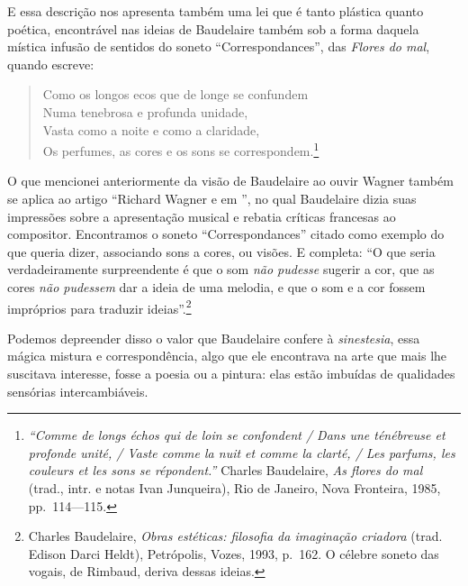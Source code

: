 E essa descrição nos apresenta também uma lei que é tanto plástica
quanto poética, encontrável nas ideias de Baudelaire também sob a forma
daquela mística infusão de sentidos do soneto “Correspondances”, das
\textit{Flores do mal}, quando escreve: 

\begin{hedraquote}
\begin{verse}
Como os longos ecos que de longe se confundem \\ 
Numa tenebrosa e profunda unidade, \\ 
Vasta como a noite e como a claridade, \\ 
Os perfumes, as cores e os sons se correspondem.\footnote{ \textit{``Comme de longs échos qui de loin se confondent /
Dans une ténébreuse et profonde unité, /
Vaste comme la nuit et comme la clarté, / 
Les parfums, les couleurs et les sons se répondent.''} 
Charles Baudelaire, \textit{As flores do mal}
(trad., intr. e notas Ivan Junqueira), Rio de Janeiro, Nova
Fronteira, 1985, pp.~114---115.}
\end{verse}
\end{hedraquote}

O que mencionei anteriormente da visão de Baudelaire ao ouvir Wagner também se
aplica ao artigo “Richard Wagner e  em ”, no qual
Baudelaire dizia suas impressões sobre a apresentação musical e rebatia
críticas francesas ao compositor. Encontramos o soneto
“Correspondances” citado como exemplo do que queria dizer, associando
sons a cores, ou visões. E completa: “O que seria verdadeiramente
surpreendente é que o som \textit{não pudesse} sugerir a cor, que as
cores \textit{não pudessem} dar a ideia de uma melodia, e que o som e a
cor fossem impróprios para traduzir ideias”.\footnote{ Charles Baudelaire,
 \textit{Obras estéticas: filosofia da imaginação criadora}
(trad. Edison Darci Heldt), Petrópolis, Vozes, 1993, p.~162. 
O célebre soneto das vogais, de Rimbaud, deriva dessas ideias.} 	

Podemos depreender disso o valor que Baudelaire confere à
\textit{sinestesia}, essa mágica mistura e correspondência, algo que
ele encontrava na arte que mais lhe suscitava interesse, fosse a poesia
ou a pintura: elas estão imbuídas de qualidades sensórias
intercambiáveis. 

